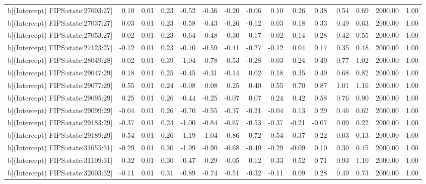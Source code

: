 \begin{table}[ht]
\begin{tabular}{rrrrrrrrrrrrrrr}
  b[(Intercept) FIPS:state:27003:27] & 0.10 & 0.01 & 0.23 & -0.52 & -0.36 & -0.20 & -0.06 & 0.10 & 0.26 & 0.38 & 0.54 & 0.69 & 2000.00 & 1.00 \\ 
  b[(Intercept) FIPS:state:27037:27] & 0.03 & 0.01 & 0.23 & -0.58 & -0.43 & -0.26 & -0.12 & 0.03 & 0.18 & 0.33 & 0.49 & 0.63 & 2000.00 & 1.00 \\ 
  b[(Intercept) FIPS:state:27053:27] & -0.02 & 0.01 & 0.23 & -0.64 & -0.48 & -0.30 & -0.17 & -0.02 & 0.14 & 0.28 & 0.42 & 0.55 & 2000.00 & 1.00 \\ 
  b[(Intercept) FIPS:state:27123:27] & -0.12 & 0.01 & 0.23 & -0.70 & -0.59 & -0.41 & -0.27 & -0.12 & 0.04 & 0.17 & 0.35 & 0.48 & 2000.00 & 1.00 \\ 
  b[(Intercept) FIPS:state:28049:28] & -0.02 & 0.01 & 0.39 & -1.04 & -0.78 & -0.53 & -0.28 & -0.03 & 0.24 & 0.49 & 0.77 & 1.02 & 2000.00 & 1.00 \\ 
  b[(Intercept) FIPS:state:29047:29] & 0.18 & 0.01 & 0.25 & -0.45 & -0.31 & -0.14 & 0.02 & 0.18 & 0.35 & 0.49 & 0.68 & 0.82 & 2000.00 & 1.00 \\ 
  b[(Intercept) FIPS:state:29077:29] & 0.55 & 0.01 & 0.24 & -0.08 & 0.08 & 0.25 & 0.40 & 0.55 & 0.70 & 0.87 & 1.01 & 1.16 & 2000.00 & 1.00 \\ 
  b[(Intercept) FIPS:state:29095:29] & 0.25 & 0.01 & 0.26 & -0.44 & -0.25 & -0.07 & 0.07 & 0.24 & 0.42 & 0.58 & 0.76 & 0.90 & 2000.00 & 1.00 \\ 
  b[(Intercept) FIPS:state:29099:29] & -0.04 & 0.01 & 0.26 & -0.70 & -0.55 & -0.37 & -0.21 & -0.04 & 0.13 & 0.29 & 0.46 & 0.62 & 2000.00 & 1.00 \\ 
  b[(Intercept) FIPS:state:29183:29] & -0.37 & 0.01 & 0.24 & -1.00 & -0.84 & -0.67 & -0.53 & -0.37 & -0.21 & -0.07 & 0.09 & 0.22 & 2000.00 & 1.00 \\ 
  b[(Intercept) FIPS:state:29189:29] & -0.54 & 0.01 & 0.26 & -1.19 & -1.04 & -0.86 & -0.72 & -0.54 & -0.37 & -0.22 & -0.03 & 0.13 & 2000.00 & 1.00 \\ 
  b[(Intercept) FIPS:state:31055:31] & -0.29 & 0.01 & 0.30 & -1.09 & -0.90 & -0.68 & -0.49 & -0.29 & -0.09 & 0.10 & 0.30 & 0.45 & 2000.00 & 1.00 \\ 
  b[(Intercept) FIPS:state:31109:31] & 0.32 & 0.01 & 0.30 & -0.47 & -0.29 & -0.05 & 0.12 & 0.33 & 0.52 & 0.71 & 0.93 & 1.10 & 2000.00 & 1.00 \\ 
  b[(Intercept) FIPS:state:32003:32] & -0.11 & 0.01 & 0.31 & -0.89 & -0.74 & -0.51 & -0.32 & -0.11 & 0.09 & 0.28 & 0.49 & 0.73 & 2000.00 & 1.00 \\ 

\end{tabular}
\end{table}
